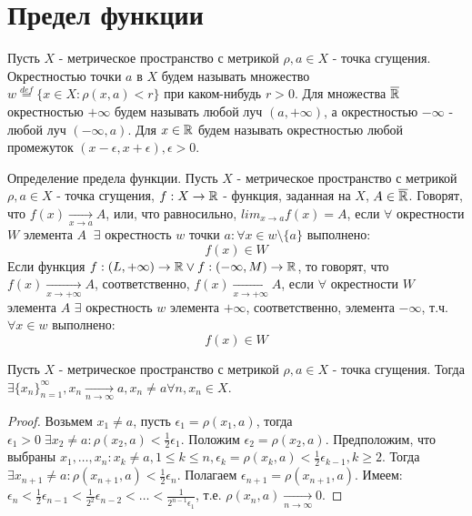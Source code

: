 \documentclass[main]{subfiles}
\begin{document}
\section{Предел функции}
\begin{definition}
    Пусть $X$ - метрическое пространство с метрикой $\rho, a \in X$ - точка 
    сгущения. Окрестностью точки $a$ в $X$ будем называть множество 
    $w \overset{def}{=} \{x \in X : \rho(x, a) < r\}$ при каком-нибудь 
    $r > 0$. Для множества $\overline{\mathbb{R}}$ окрестностью $+\infty$ будем 
    называть любой луч $(a, +\infty)$, а окрестностью $-\infty$ - 
    любой луч $(-\infty, a)$. Для $x \in \mathbb{R}$ будем называть окрестностью 
    любой промежуток $(x - \epsilon, x + \epsilon), \epsilon > 0$.
\end{definition}

\begin{definition}
    Определение предела функции. Пусть $X$ - метрическое пространство с метрикой
    $\rho, a \in X$ - точка сгущения, $f: X \to \mathbb{R}$ - функция, заданная на 
    $X$, $A \in \overline{\mathbb{R}}$. Говорят, что $f(x) \underset{x \to a}{\to} A$,
    или, что равносильно, $lim_{x \to a}f(x) = A$, если $\forall$ окрестности
    $W$ элемента $A \;\; \exists$ окрестность $w$ точки $a : \forall x \in w 
    \setminus \{a\}$ выполнено:
    \begin{equation}\label{mem1}
        f(x) \in W
    \end{equation}
    Если функция $f: (L, +\infty) \to \mathbb{R} \vee f: (-\infty, M) \to \mathbb{R}$, то 
    говорят, что $f(x) \underset{x\to +\infty}{\to} A$, соответственно, 
    $f(x) \underset{x\to +\infty}{\to} A$, если $\forall$ окрестности $W$ 
    элемента $A$ $\exists$ окрестность $w$ элемента $+\infty$, соответственно,
    элемента $-\infty$, т.ч. $\forall x \in w$ выполнено:
    \begin{equation}\label{mem1dot}
        f(x) \in W
    \end{equation}
\end{definition}

\begin{assertion}
    Пусть $X$ - метрическое пространство с метрикой $\rho, a \in X$ - точка
    сгущения. Тогда $\exists \{x_n\}_{n=1}^{\infty}, x_n \underset{n\to\infty}{\to}
    a, x_n \neq a \forall n, x_n \in X$.
\end{assertion}
\begin{proof}
    Возьмем $x_1 \neq a$, пусть $\epsilon_1 = \rho(x_1, a)$, тогда $\epsilon_1 
    > 0 \; \exists x_2 \neq a : \rho(x_2, a) < \frac{1}{2}\epsilon_1$.
    Положим $\epsilon_2 = \rho(x_2, a)$. Предположим, что выбраны $x_1, \ldots, 
    x_n : x_k \neq a, 1 \leq k \leq n, \epsilon_k = \rho(x_k, a) < \frac{1}{2}
    \epsilon_{k-1}, k \geq 2$. Тогда $\exists x_{n+1} \neq a : \rho(x_{n+1}, a) <
    \frac{1}{2}\epsilon_n$. Полагаем $\epsilon_{n+1} = \rho(x_{n+1}, a)$. 
    Имеем: $\epsilon_n < \frac{1}{2}\epsilon_{n-1} < \frac{1}{2^2}\epsilon_{n-2} <
    \ldots < \frac{1}{2^{n-1}\epsilon_1}$, т.е. 
    $\rho(x_n , a) \underset{n\to\infty}{\to} 0$.
\end{proof}
\end{document}
